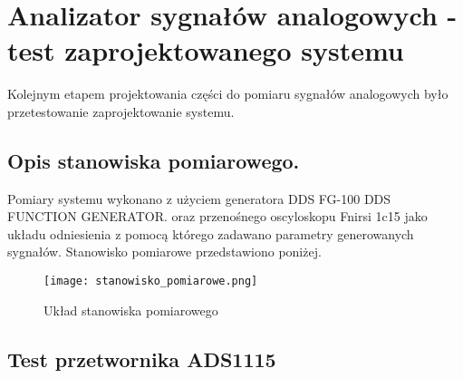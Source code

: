 \section{Analizator sygnałów analogowych - test zaprojektowanego systemu}
Kolejnym etapem projektowania części do pomiaru sygnałów analogowych było przetestowanie 
zaprojektowanie systemu.

\subsection{Opis stanowiska pomiarowego.}
Pomiary systemu wykonano z użyciem generatora DDS FG-100 DDS FUNCTION GENERATOR.
oraz przenośnego oscyloskopu Fnirsi 1c15 jako układu odniesienia z pomocą którego
zadawano parametry generowanych sygnałów. Stanowisko pomiarowe przedstawiono poniżej.

    \begin{figure}[!ht]
        \centering
        \texttt{[image: stanowisko\_pomiarowe.png]}
        \caption{Układ stanowiska pomiarowego}
        \label{fig:gui_white}
    \end{figure}

\subsection{Test przetwornika ADS1115}
